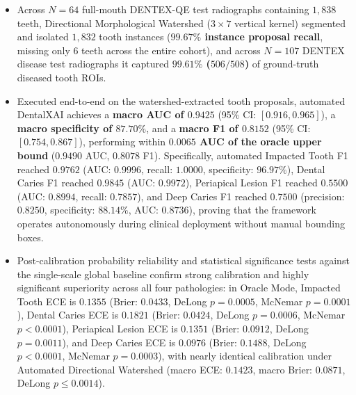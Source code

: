 \documentclass[review]{elsarticle}
\begin{document}
\begin{itemize}
    \item Across $N=64$ full-mouth DENTEX-QE test radiographs containing $1,838$ teeth, Directional Morphological Watershed ($3 \times 7$ vertical kernel) segmented and isolated $1,832$ tooth instances (\textbf{$99.67\%$ instance proposal recall}, missing only 6 teeth across the entire cohort), and across $N=107$ DENTEX disease test radiographs it captured \textbf{$99.61\%$ ($506/508$)} of ground-truth diseased tooth ROIs.
    \item Executed end-to-end on the watershed-extracted tooth proposals, automated DentalXAI achieves a \textbf{macro AUC of $0.9425$} (95\% CI: $[0.916, 0.965]$), a \textbf{macro specificity of $87.70\%$}, and a \textbf{macro F1 of $0.8152$} (95\% CI: $[0.754, 0.867]$), performing within \textbf{$0.0065$ AUC of the oracle upper bound} ($0.9490$ AUC, $0.8078$ F1). Specifically, automated Impacted Tooth F1 reached $0.9762$ (AUC: $0.9996$, recall: $1.0000$, specificity: $96.97\%$), Dental Caries F1 reached $0.9845$ (AUC: $0.9972$), Periapical Lesion F1 reached $0.5500$ (AUC: $0.8994$, recall: $0.7857$), and Deep Caries F1 reached $0.7500$ (precision: $0.8250$, specificity: $88.14\%$, AUC: $0.8736$), proving that the framework operates autonomously during clinical deployment without manual bounding boxes.
    \item Post-calibration probability reliability and statistical significance tests against the single-scale global baseline confirm strong calibration and highly significant superiority across all four pathologies: in Oracle Mode, Impacted Tooth ECE is $0.1355$ (Brier: $0.0433$, DeLong $p = 0.0005$, McNemar $p = 0.0001$), Dental Caries ECE is $0.1821$ (Brier: $0.0424$, DeLong $p = 0.0006$, McNemar $p < 0.0001$), Periapical Lesion ECE is $0.1351$ (Brier: $0.0912$, DeLong $p = 0.0011$), and Deep Caries ECE is $0.0976$ (Brier: $0.1488$, DeLong $p < 0.0001$, McNemar $p = 0.0003$), with nearly identical calibration under Automated Directional Watershed (macro ECE: $0.1423$, macro Brier: $0.0871$, DeLong $p \le 0.0014$).
\end{itemize}
\end{document}
